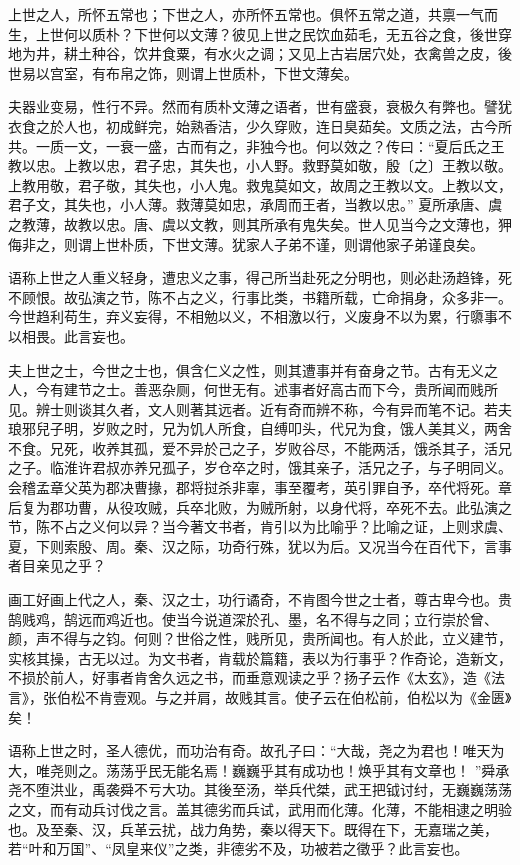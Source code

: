 \documentclass[]{article}
\begin{document}
上世之人，所怀五常也；下世之人，亦所怀五常也。俱怀五常之道，共禀一气而生，上世何以质朴？下世何以文薄？彼见上世之民饮血茹毛，无五谷之食，後世穿地为井，耕土种谷，饮井食粟，有水火之调；又见上古岩居穴处，衣禽兽之皮，後世易以宫室，有布帛之饰，则谓上世质朴，下世文薄矣。

夫器业变易，性行不异。然而有质朴文薄之语者，世有盛衰，衰极久有弊也。譬犹衣食之於人也，初成鲜完，始熟香洁，少久穿败，连日臭茹矣。文质之法，古今所共。一质一文，一衰一盛，古而有之，非独今也。何以效之？传曰：``夏后氏之王教以忠。上教以忠，君子忠，其失也，小人野。救野莫如敬，殷〔之〕王教以敬。上教用敬，君子敬，其失也，小人鬼。救鬼莫如文，故周之王教以文。上教以文，君子文，其失也，小人薄。救薄莫如忠，承周而王者，当教以忠。''
夏所承唐、虞之教薄，故教以忠。唐、虞以文教，则其所承有鬼失矣。世人见当今之文薄也，狎侮非之，则谓上世朴质，下世文薄。犹家人子弟不谨，则谓他家子弟谨良矣。

语称上世之人重义轻身，遭忠义之事，得己所当赴死之分明也，则必赴汤趋锋，死不顾恨。故弘演之节，陈不占之义，行事比类，书籍所载，亡命捐身，众多非一。今世趋利苟生，弃义妄得，不相勉以义，不相激以行，义废身不以为累，行隳事不以相畏。此言妄也。

夫上世之士，今世之士也，俱含仁义之性，则其遭事并有奋身之节。古有无义之人，今有建节之士。善恶杂厕，何世无有。述事者好高古而下今，贵所闻而贱所见。辨士则谈其久者，文人则著其远者。近有奇而辨不称，今有异而笔不记。若夫琅邪兒子明，岁败之时，兄为饥人所食，自缚叩头，代兄为食，饿人美其义，两舍不食。兄死，收养其孤，爱不异於己之子，岁败谷尽，不能两活，饿杀其子，活兄之子。临淮许君叔亦养兄孤子，岁仓卒之时，饿其亲子，活兄之子，与子明同义。会稽孟章父英为郡决曹掾，郡将挝杀非辜，事至覆考，英引罪自予，卒代将死。章后复为郡功曹，从役攻贼，兵卒北败，为贼所射，以身代将，卒死不去。此弘演之节，陈不占之义何以异？当今著文书者，肯引以为比喻乎？比喻之证，上则求虞、夏，下则索殷、周。秦、汉之际，功奇行殊，犹以为后。又况当今在百代下，言事者目亲见之乎？

画工好画上代之人，秦、汉之士，功行谲奇，不肯图今世之士者，尊古卑今也。贵鹄贱鸡，鹄远而鸡近也。使当今说道深於孔、墨，名不得与之同；立行崇於曾、颜，声不得与之钧。何则？世俗之性，贱所见，贵所闻也。有人於此，立义建节，实核其操，古无以过。为文书者，肯载於篇籍，表以为行事乎？作奇论，造新文，不损於前人，好事者肯舍久远之书，而垂意观读之乎？扬子云作《太玄》，造《法言》，张伯松不肯壹观。与之并肩，故贱其言。使子云在伯松前，伯松以为《金匮》矣！

语称上世之时，圣人德优，而功治有奇。故孔子曰：``大哉，尧之为君也！唯天为大，唯尧则之。荡荡乎民无能名焉！巍巍乎其有成功也！焕乎其有文章也！
''舜承尧不堕洪业，禹袭舜不亏大功。其後至汤，举兵代桀，武王把钺讨纣，无巍巍荡荡之文，而有动兵讨伐之言。盖其德劣而兵试，武用而化薄。化薄，不能相逮之明验也。及至秦、汉，兵革云扰，战力角势，秦以得天下。既得在下，无嘉瑞之美，若``叶和万国''、``凤皇来仪''之类，非德劣不及，功被若之徵乎？此言妄也。
\end{document}
